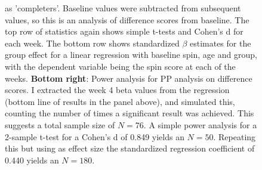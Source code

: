 \begin{figure}
{as 'completers'. Baseline values were subtracted from subsequent values, so this
is an analysis of difference scores from baseline. 
The top row of statistics again shows simple t-tests and Cohen's d for each
week. The bottom row shows standardized $\beta$ estimates for the group effect
for a linear regression with baseline spin, age and group, with the dependent
variable being the spin score at each of the weeks. 
%
%
{\bf Bottom right}: Power analysis for PP analysis on difference scores. I extracted the week 4 beta
values from the regression (bottom line of results in the panel above), and
simulated this, counting the number of times a significant result was achieved.
This suggests a total sample size of $N=76$. 
A simple power analysis for a 2-sample t-test for a Cohen's d of 0.849 yields an
$N=50$. Repeating this but using as effect size the standardized regression
coefficient of 0.440 yields an $N=180$. 
}
\label{f:power}
\end{figure}









